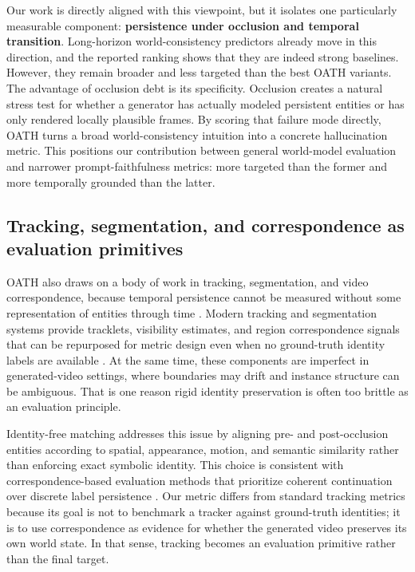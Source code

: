 \documentclass{article}
\begin{document}
Our work is directly aligned with this viewpoint, but it isolates one particularly measurable component: \textbf{persistence under occlusion and temporal transition}. Long-horizon world-consistency predictors already move in this direction, and the reported ranking shows that they are indeed strong baselines. However, they remain broader and less targeted than the best OATH variants. The advantage of occlusion debt is its specificity. Occlusion creates a natural stress test for whether a generator has actually modeled persistent entities or has only rendered locally plausible frames. By scoring that failure mode directly, OATH turns a broad world-consistency intuition into a concrete hallucination metric. This positions our contribution between general world-model evaluation and narrower prompt-faithfulness metrics: more targeted than the former and more temporally grounded than the latter.

\subsection{Tracking, segmentation, and correspondence as evaluation primitives}

OATH also draws on a body of work in tracking, segmentation, and video correspondence, because temporal persistence cannot be measured without some representation of entities through time \cite{deepsort2017,bytetrack2022,motr2021,xmem2022,sam2023,mask2former2022}. Modern tracking and segmentation systems provide tracklets, visibility estimates, and region correspondence signals that can be repurposed for metric design even when no ground-truth identity labels are available \cite{deepsort2017,bytetrack2022,xmem2022}. At the same time, these components are imperfect in generated-video settings, where boundaries may drift and instance structure can be ambiguous. That is one reason rigid identity preservation is often too brittle as an evaluation principle.

Identity-free matching addresses this issue by aligning pre- and post-occlusion entities according to spatial, appearance, motion, and semantic similarity rather than enforcing exact symbolic identity. This choice is consistent with correspondence-based evaluation methods that prioritize coherent continuation over discrete label persistence \cite{xmem2022,sam2023,bytetrack2022}. Our metric differs from standard tracking metrics because its goal is not to benchmark a tracker against ground-truth identities; it is to use correspondence as evidence for whether the generated video preserves its own world state. In that sense, tracking becomes an evaluation primitive rather than the final target.
\end{document}
